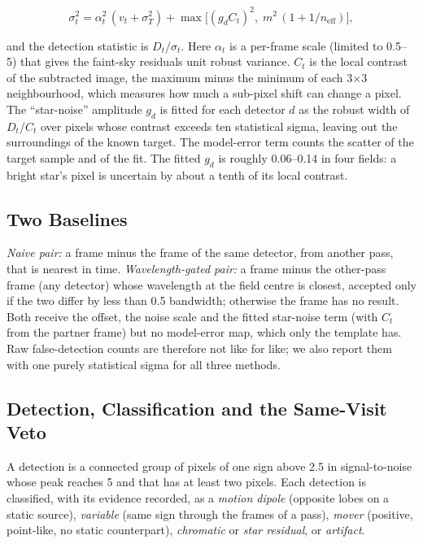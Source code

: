 \documentclass[conference]{IEEEtran}
\begin{document}
\begin{equation}
\sigma_t^2=\alpha_t^2\,(v_t+\sigma_T^2)+\max\!\bigl[(g_dC_t)^2,\;m^2\,(1+1/n_{\mathrm{eff}})\bigr],
\end{equation}

\noindent and the detection statistic is $D_{t}$/$\sigma_{t}$. Here $\alpha_{t}$ is a per-frame scale (limited to 0.5--5) that gives the faint-sky residuals unit robust variance. $C_{t}$ is the local contrast of the subtracted image, the maximum minus the minimum of each 3$\times$3 neighbourhood, which measures how much a sub-pixel shift can change a pixel. The ``star-noise'' amplitude $g_{d}$ is fitted for each detector $d$ as the robust width of $D_{t}$/$C_{t}$ over pixels whose contrast exceeds ten statistical sigma, leaving out the surroundings of the known target. The model-error term counts the scatter of the target sample and of the fit. The fitted $g_{d}$ is roughly 0.06--0.14 in four fields: a bright star's pixel is uncertain by about a tenth of its local contrast.

\subsection{Two Baselines}

\emph{Naive pair:} a frame minus the frame of the same detector, from another pass, that is nearest in time. \emph{Wavelength-gated pair:} a frame minus the other-pass frame (any detector) whose wavelength at the field centre is closest, accepted only if the two differ by less than 0.5 bandwidth; otherwise the frame has no result. Both receive the offset, the noise scale and the fitted star-noise term (with $C_{t}$ from the partner frame) but no model-error map, which only the template has. Raw false-detection counts are therefore not like for like; we also report them with one purely statistical sigma for all three methods.

\subsection{Detection, Classification and the Same-Visit Veto}

A detection is a connected group of pixels of one sign above 2.5 in signal-to-noise whose peak reaches 5 and that has at least two pixels. Each detection is classified, with its evidence recorded, as a \emph{motion dipole} (opposite lobes on a static source), \emph{variable} (same sign through the frames of a pass), \emph{mover} (positive, point-like, no static counterpart), \emph{chromatic} or \emph{star residual}, or \emph{artifact}.
\end{document}

